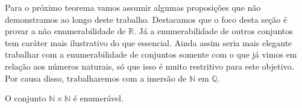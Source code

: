 \documentclass[../main.tex]{subfiles}
\begin{document}
Para o próximo teorema vamos assumir algumas proposições que não demonstramos ao longo deste trabalho. Destacamos que o foco desta seção é provar a não enumerabilidade de $\mathbb{R}$. Já a enumerabilidade de outros conjuntos tem caráter mais ilustrativo do que essencial. Ainda assim seria mais elegante trabalhar com a enumerabilidade de conjuntos somente com o que já vimos em relação aos números naturais, só que isso é muito restritivo para este objetivo. Por causa disso, trabalharemos com a imersão de $\mathbb{N}$ em $\mathbb{Q}$.
\begin{teo}\label{enum-teo-NxNEnumeravel}
    O conjunto $\mathbb{N} \times \mathbb{N}$ é enumerável.
\end{teo}
\end{document}
